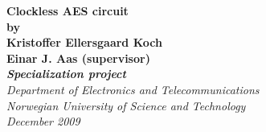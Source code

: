 \thispagestyle{empty}
\begin{center}        %

  \vspace{25mm}          %

  \LARGE
  \textbf{Clockless AES circuit} \\

  \vspace{5mm}
  \textbf{by} \\
  \vspace{5mm}
  \normalsize
  \textbf{Kristoffer Ellersgaard Koch} \\

  \textbf{Einar J. Aas (supervisor)}\\
  \vspace{30mm}
  \Large
  {\bf{\textsl{Specialization project}}} \\
  \vspace{20mm}
  \textsl{Department of Electronics and Telecommunications} \\
  \textsl{Norwegian University of Science and Technology} \\
  \vspace{10mm}
  \large
  \textsl{December 2009} \\
  \vspace{5mm}
  \normalsize
\end{center}
